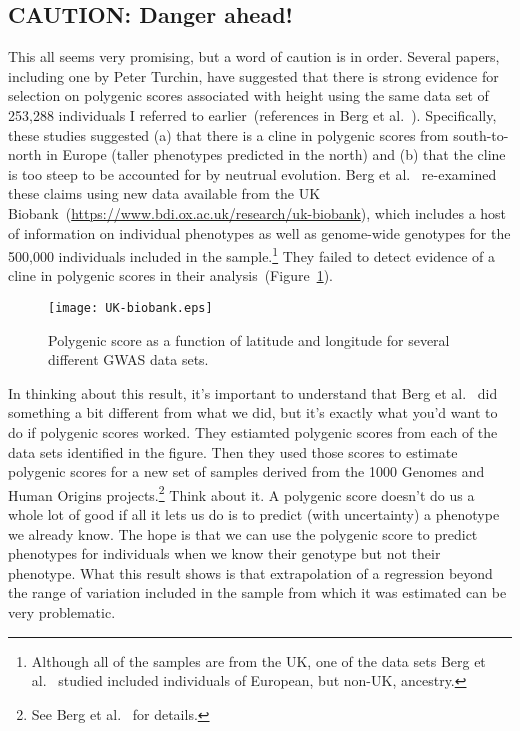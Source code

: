 \subsection*{CAUTION: Danger ahead!}

This all seems very promising, but a word of caution is in
order. Several papers, including one by Peter Turchin, have suggested
that there is strong evidence for selection on polygenic scores
associated with height using the same data set of 253,288 individuals
I referred to earlier~(references in Berg et
al.~\cite{Berg-etal-2018}). Specifically, these studies suggested (a)
that there is a cline in polygenic scores from south-to-north in
Europe (taller phenotypes predicted in the north) and (b) that the
cline is too steep to be accounted for by neutrual evolution. Berg et
al.~\cite{Berg-etal-2018} re-examined these claims using new data
available from the UK
Biobank~(\url{https://www.bdi.ox.ac.uk/research/uk-biobank}), which
includes a host of information on individual phenotypes as well as
genome-wide genotypes for the 500,000 individuals included in the
sample.\footnote{Although all of the samples are from the UK, one of
  the data sets Berg et al.~\cite{Berg-etal-2018} studied included
  individuals of European, but non-UK, ancestry.} They failed to
detect evidence of a cline in polygenic scores in their
analysis~(Figure~\ref{fig:UK-biobank}).

\begin{figure}
  \begin{center}
    \texttt{[image: UK-biobank.eps]}
  \end{center}
  \caption{Polygenic score as a function of latitude and longitude for
    several different GWAS data sets.}\label{fig:UK-biobank}
\end{figure}

In thinking about this result, it's important to understand that Berg
et al.~\cite{Berg-etal-2018} did something a bit different from what
we did, but it's exactly what you'd want to do if polygenic scores
worked. They estiamted polygenic scores from each of the data sets
identified in the figure. Then they used those scores to estimate
polygenic scores for a new set of samples derived from the 1000
Genomes and Human Origins projects.\footnote{See Berg et
  al.~\cite{Berg-etal-2018} for details.} Think about it. A polygenic
score doesn't do us a whole lot of good if all it lets us do is to
predict (with uncertainty) a phenotype we already know. The hope is
that we can use the polygenic score to predict phenotypes for
individuals when we know their genotype but not their phenotype. What
this result shows is that extrapolation of a regression beyond the
range of variation included in the sample from which it was estimated
can be very problematic.

